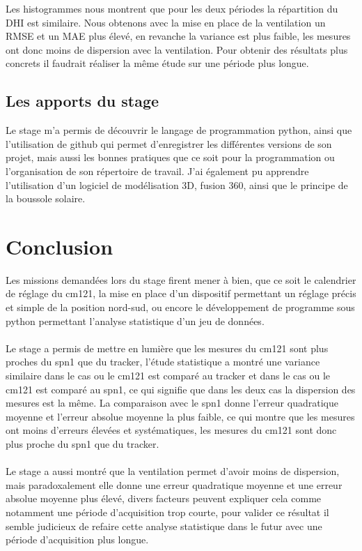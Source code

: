 \documentclass[12pt,a4paper]{article}
\begin{document}
\begin{flushleft}
Les histogrammes nous montrent que pour les deux périodes la répartition du DHI est similaire.
Nous obtenons avec la mise en place de la ventilation un RMSE et un MAE plus élevé, en revanche la variance est plus faible, les mesures ont donc moins de dispersion avec la ventilation. Pour obtenir des résultats plus concrets il faudrait réaliser la même étude sur une période plus longue.

\subsection{Les apports du stage}

Le stage m'a permis de découvrir le langage de programmation python, ainsi que l'utilisation de github qui permet d'enregistrer les différentes versions de son projet, mais aussi les bonnes pratiques que ce soit pour la programmation ou l'organisation de son répertoire de travail. J'ai également pu apprendre l'utilisation d'un logiciel de modélisation 3D, fusion 360, ainsi que le principe de la boussole solaire.


\section{Conclusion}

Les missions demandées lors du stage firent mener à bien, que ce soit le calendrier de réglage du cm121, la mise en place d'un dispositif permettant un réglage précis et simple de la position nord-sud, ou encore le développement de programme sous python permettant l'analyse statistique d'un jeu de données.\\
~\\
Le stage a permis de mettre en lumière que les mesures du cm121 sont plus proches du spn1 que du tracker, l'étude statistique a montré une variance similaire dans le cas ou le cm121 est comparé au tracker et dans le cas ou le cm121 est comparé au spn1, ce qui signifie que dans les deux cas la dispersion des mesures est la même. La comparaison avec le spn1 donne l'erreur quadratique  moyenne et l'erreur absolue moyenne la plus faible, ce qui montre que les mesures ont   moins d'erreurs élevées et systématiques, les mesures du cm121 sont donc plus proche du spn1 que du tracker.\\
~\\
Le stage a aussi montré que la ventilation permet d'avoir moins de dispersion, mais paradoxalement elle donne une erreur quadratique moyenne et une erreur absolue moyenne plus élevé, divers facteurs peuvent expliquer cela comme notamment une période d'acquisition trop courte, pour valider ce résultat il semble judicieux de refaire cette analyse statistique dans le futur avec une période d'acquisition plus longue.


\end{flushleft}
\end{document}
